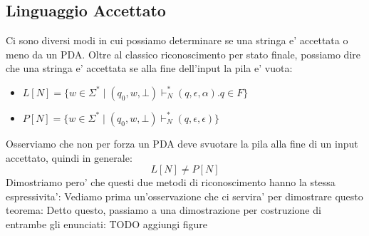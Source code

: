 \subsection{Linguaggio Accettato}
Ci sono diversi modi in cui possiamo determinare se una stringa e' accettata o meno da un PDA. Oltre al classico riconoscimento per stato finale, possiamo dire che una stringa e' accettata se alla fine dell'input la pila e' vuota:
\begin{itemize}
  \item $ L[N] = \{w \in \Sigma^* \mid (q_0, w, \bot) \vdash^*_N (q, \epsilon, \alpha). q \in F\} $
  \item $ P[N] = \{w \in \Sigma^* \mid (q_0, w, \bot) \vdash^*_N (q, \epsilon, \epsilon)\} $
\end{itemize}

Osserviamo che non per forza un PDA deve svuotare la pila alla fine di un input accettato, quindi in generale:
\[
  L[N] \neq P[N]
\]
Dimostriamo pero' che questi due metodi di riconoscimento hanno la stessa espressivita':
Vediamo prima un'osservazione che ci servira' per dimostrare questo teorema:
Detto questo, passiamo a una dimostrazione per costruzione di entrambe gli enunciati: TODO aggiungi figure
